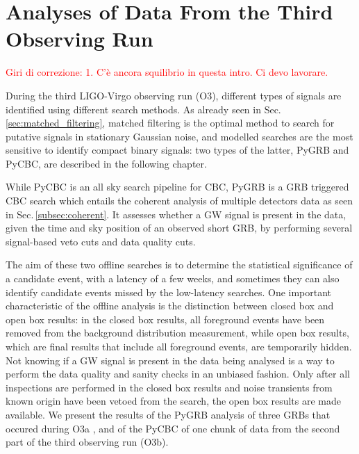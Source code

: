\documentclass[binding=0.6cm, LaM]{sapthesis}
\newcommand{\fpg}[1]{\textcolor{red}{#1} }
\begin{document}
\chapter{Analyses of Data From the Third Observing Run}
\label{ch:datanalysis}
\fpg{Giri di correzione: 1.}%
\fpg{C'\`e ancora squilibrio in questa intro.  Ci devo lavorare.} 


During the third LIGO-Virgo observing run (O3),
	different types of signals are identified using different search methods.
	As already seen in Sec.\ref{sec:matched_filtering}, matched filtering is the optimal method 
	to search for putative signals in stationary Gaussian noise,
	and modelled searches are the most sensitive to identify compact binary signals:
	two types of the latter, {\ttfamily PyGRB} and {\ttfamily PyCBC}, 
	are described in the following chapter.

	While {\ttfamily PyCBC} is an all sky search pipeline for CBC,
	{\ttfamily PyGRB} is a GRB triggered CBC search
        which entails the coherent analysis of multiple detectors data as seen in Sec.\,\ref{subsec:coherent}.
        It assesses whether a GW signal is present in the data,
        given the time and sky position of an observed short GRB,
        by performing several signal-based veto cuts and data quality cuts.

	The aim of these two offline searches is to determine the statistical significance of a candidate event,
	with a latency of a few weeks, and sometimes they can also identify candidate events missed by the low-latency searches. 
	One important characteristic of the offline analysis is the distinction between closed box and open box results:
	in the closed box results, all foreground events have been removed from the background distribution measurement,
	while open box results, which are final results that include all foreground events, are temporarily hidden. 
	Not knowing if a GW signal is present in the data being analysed is a way to perform the data quality and sanity checks in an unbiased fashion.
	Only after all inspections are performed in the closed box results and 
	noise transients from known origin have been vetoed from the search, 
	the open box results are made available. 	
	We present the results of the {\ttfamily PyGRB} analysis of three GRBs that occured during O3a \cite{43}, and
        of the {\ttfamily PyCBC} of one chunk of data from the second part of the third observing run (O3b).
\end{document}
